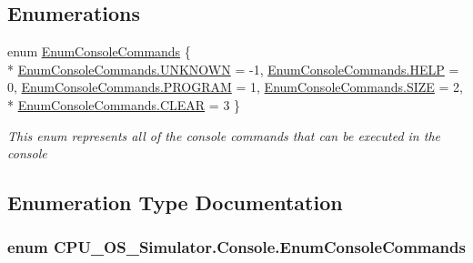 \subsection*{Enumerations}
\begin{DoxyCompactItemize}
\item 
enum \hyperlink{namespace_c_p_u___o_s___simulator_1_1_console_a5d9f2366d41d3eb074f056be426272d7}{Enum\+Console\+Commands} \{ \\*
\hyperlink{namespace_c_p_u___o_s___simulator_1_1_console_a5d9f2366d41d3eb074f056be426272d7a696b031073e74bf2cb98e5ef201d4aa3}{Enum\+Console\+Commands.\+U\+N\+K\+N\+O\+W\+N} = -\/1, 
\hyperlink{namespace_c_p_u___o_s___simulator_1_1_console_a5d9f2366d41d3eb074f056be426272d7a4fc963e213bba362778f5c175eb4d5ff}{Enum\+Console\+Commands.\+H\+E\+L\+P} = 0, 
\hyperlink{namespace_c_p_u___o_s___simulator_1_1_console_a5d9f2366d41d3eb074f056be426272d7ac9c31422636176fa93724df8b6e3ef31}{Enum\+Console\+Commands.\+P\+R\+O\+G\+R\+A\+M} = 1, 
\hyperlink{namespace_c_p_u___o_s___simulator_1_1_console_a5d9f2366d41d3eb074f056be426272d7a62e5cef85d46f1a5a2144d9fd463b79e}{Enum\+Console\+Commands.\+S\+I\+Z\+E} = 2, 
\\*
\hyperlink{namespace_c_p_u___o_s___simulator_1_1_console_a5d9f2366d41d3eb074f056be426272d7a813461e0c58e7ad59a2fd83ca2237fec}{Enum\+Console\+Commands.\+C\+L\+E\+A\+R} = 3
 \}\begin{DoxyCompactList}\small\item\em This enum represents all of the console commands that can be executed in the console \end{DoxyCompactList}
\end{DoxyCompactItemize}


\subsection{Enumeration Type Documentation}
\hypertarget{namespace_c_p_u___o_s___simulator_1_1_console_a5d9f2366d41d3eb074f056be426272d7}{}
\subsubsection[{Enum\+Console\+Commands}]{\setlength{\rightskip}{0pt plus 5cm}enum {\bf C\+P\+U\+\_\+\+O\+S\+\_\+\+Simulator.\+Console.\+Enum\+Console\+Commands}\hspace{0.3cm}{\ttfamily [strong]}}\label{namespace_c_p_u___o_s___simulator_1_1_console_a5d9f2366d41d3eb074f056be426272d7}


